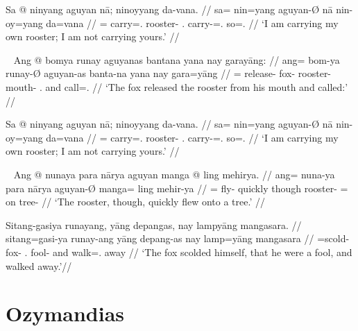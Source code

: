 \a\label{ex:negativbindung}\begingl
	\gla Sa @ ninyang aguyan nā; ninoyyang da-vana. //
	\glb sa= nin=yang aguyan-Ø nā nin-oy=yang da=vana //
	\glc \PatT{}= carry=\Fsg{}.\Aarg{} rooster-\Top{} \Fsg{}.\Gen{}
		carry-\Neg{}=\Fsg{}.\Aarg{} so=\Spl{}.\Gen{} //
	\glft `I am carrying my own rooster; I am not carrying yours.' //
\endgl

\xe

\pex~ %
\a\begingl
	\gla Ang @ bomya runay aguyanas bantana yana nay garayāng: //
	\glb ang= bom-ya runay-Ø aguyan-as banta-na yana nay gara=yāng //
	\glc \AgtT{}= release-\TsgM{} fox-\Top{} rooster-\Parg{} mouth-\Gen{}
		\TsgM{}.\Gen{} and call=\TsgM{}.\Aarg{} //
	\glft `The fox released the rooster from his mouth and called:' //
\endgl

\a\begingl
	\gla Sa @ ninyang aguyan nā; ninoyyang da-vana. //
	\glb sa= nin=yang aguyan-Ø nā nin-oy=yang da=vana //
	\glc \PatT{}= carry=\Fsg{}.\Aarg{} rooster-\Top{} \Fsg{}.\Gen{}
		carry-\Neg{}=\Fsg{}.\Aarg{} so=\Spl{}.\Gen{} //
	\glft `I am carrying my own rooster; I am not carrying yours.' //
\endgl

\xe

\pex~ %
\a\begingl
	\gla Ang @ nunaya para nārya aguyan manga @ ling mehirya. //
	\glb ang= nuna-ya para nārya aguyan-Ø manga= ling mehir-ya //
	\glc \AgtT{}= fly-\TsgM{} quickly though rooster-\Top{} \Dir{}= on
		tree-\Loc{} //
	\glft `The rooster, though, quickly flew onto a tree.' //
\endgl

\a\label{ex:objpred}\begingl
	\gla Sitang-gasiya runayang, yāng depangas, nay lampyāng mangasara. //
	\glb sitang=gasi-ya runay-ang yāng depang-as nay lamp=yāng mangasara //
	\glc \Refl{}=scold-\TsgM{} fox-\Aarg{} \TsgM{}.\Aarg{} fool-\Parg{} and
		walk=\TsgM{}.\Aarg{} away //
	\glft `The fox scolded himself, that he were a fool, and walked 
		away.'\footnotemark //
\endgl

\xe


\section{Ozymandias}
\label{sec:ozymandias}


\citep[Adapted from][]{becker:ozymandias}\medskip

